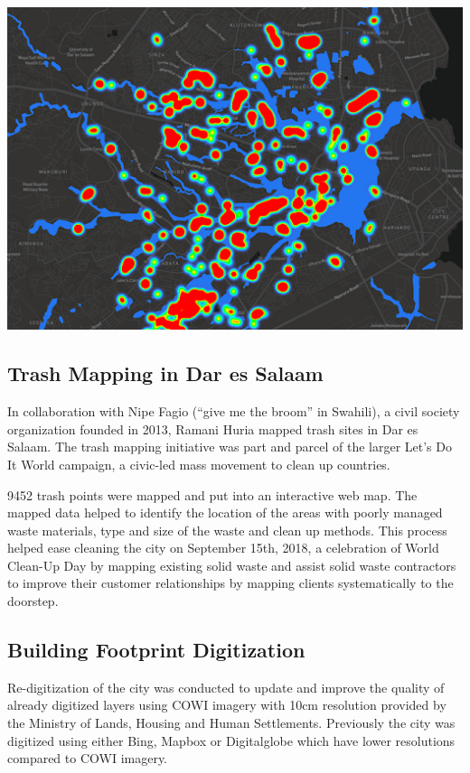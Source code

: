 \documentclass[a4paper,12pt,twoside]{article}
\begin{document}
\begin{centering}
\includegraphics[width=\textwidth]{images/Asset_&_Threats_Viz.png}
\end{centering}

\subsection{Trash Mapping in Dar es Salaam}
In collaboration with Nipe Fagio (“give me the broom” in Swahili), a civil society organization founded in 2013, Ramani Huria mapped trash sites in Dar es Salaam. The trash mapping initiative was part and parcel of the larger Let’s Do It World campaign, a civic-led mass movement to clean up countries.

9452 trash points were mapped and put into an interactive web map. The mapped data helped to identify the location of the areas with poorly managed waste materials, type and size of the waste and clean up methods. This process helped ease cleaning the city on September 15th, 2018, a celebration of World Clean-Up Day by mapping existing solid waste and assist solid waste contractors to improve their customer relationships by mapping clients systematically to the doorstep.

\subsection{Building Footprint Digitization}
Re-digitization of the city was conducted to update and improve the quality of already digitized layers using COWI imagery with 10cm resolution provided by the Ministry of Lands, Housing and Human Settlements. Previously the city was digitized using either Bing, Mapbox or Digitalglobe which have lower resolutions compared to COWI imagery.
\end{document}
